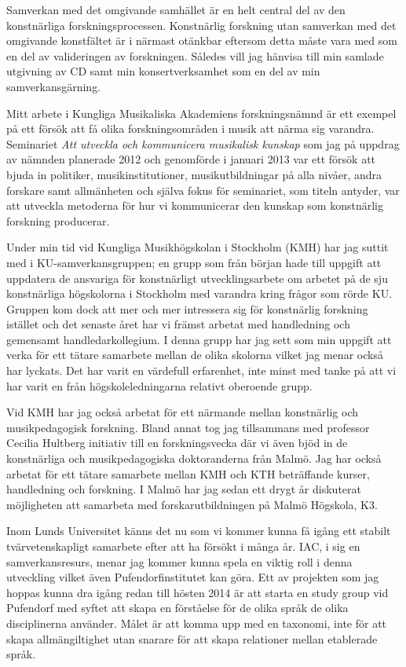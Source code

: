 \documentclass[a4paper]{article}
\begin{document}
Samverkan med det omgivande samhället är en helt central del av den konstnärliga forskningsprocessen. Konstnärlig forskning utan samverkan med det omgivande konstfältet är i närmast otänkbar eftersom detta måste vara med som en del av valideringen av forskningen. Således vill jag hänvisa till min samlade utgivning av CD samt min konsertverksamhet som en del av min samverkansgärning.

Mitt arbete i Kungliga Musikaliska Akademiens forskningsnämnd är ett exempel på ett försök att få olika forskningsområden i musik att närma sig varandra. Seminariet \emph{Att utveckla och kommunicera musikalisk kunskap} som jag på uppdrag av nämnden planerade 2012 och genomförde i januari 2013 var ett försök att bjuda in politiker, musikinstitutioner, musikutbildningar på alla nivåer, andra forskare samt allmänheten och själva fokus för seminariet, som titeln antyder, var att utveckla metoderna för hur vi kommunicerar den kunskap som konstnärlig forskning producerar.

Under min tid vid Kungliga Musikhögskolan i Stockholm (KMH) har jag suttit med i KU-samverkansgruppen; en grupp som från början hade till uppgift att uppdatera de ansvariga för konstnärligt utvecklingsarbete om arbetet på de sju konstnärliga högskolorna i Stockholm med varandra kring frågor som rörde KU. Gruppen kom dock att mer och mer intressera sig för konstnärlig forskning istället och det senaste året har vi främst arbetat med handledning och gemensamt handledarkollegium. I denna grupp har jag sett som min uppgift att verka för ett tätare samarbete mellan de olika skolorna vilket jag menar också har lyckats. Det har varit en värdefull erfarenhet, inte minst med tanke på att vi har varit en från högskoleledningarna relativt oberoende grupp.

Vid KMH har jag också arbetat för ett närmande mellan konstnärlig och musikpedagogisk forskning. Bland annat tog jag tillsammans med professor Cecilia Hultberg initiativ till en forskningsvecka där vi även bjöd in de konstnärliga och musikpedagogiska doktoranderna från Malmö. Jag har också arbetat för ett tätare samarbete mellan KMH och KTH beträffande kurser, handledning och forskning. I Malmö har jag sedan ett drygt år diskuterat möjligheten att samarbeta med forskarutbildningen på Malmö Högskola, K3.

Inom Lunds Universitet känns det nu som vi kommer kunna få igång ett stabilt tvärvetenskapligt samarbete efter att ha försökt i många år. IAC, i sig en samverkansresurs, menar jag kommer kunna spela en viktig roll i denna utveckling vilket även Pufendorfinstitutet kan göra. Ett av projekten som jag hoppas kunna dra igång redan till hösten 2014 är att starta en study group vid Pufendorf med syftet att skapa en förståelse för de olika språk de olika disciplinerna använder. Målet är att komma upp med en taxonomi, inte för att skapa allmängiltighet utan snarare för att skapa relationer mellan etablerade språk.
\end{document}
